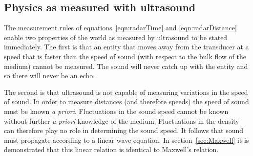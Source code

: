 \documentclass[10pt, fleqn,final,showtrims,oldfontcommands, article,a4paper,oneside]{memoir} %
\newcommand{\secref}[1]{section~\ref{sec:#1}}
\begin{document}




\subsection{Physics as measured with ultrasound}

The measurement rules of equations~\ref{eqn:radarTime} and \ref{eqn:radarDistance} enable two properties of the world as measured by ultrasound to be stated immediately.
The first is that an entity that moves away from the transducer at a speed that is faster than the speed of sound (with respect to the bulk flow of the medium) 
cannot be measured.  
The sound will never catch  up with the entity and so there will never be an echo.

The second is that ultrasound is not capable of  measuring variations in the speed of sound.
In order to measure distances (and therefore speeds) the speed of sound must be known {\em a priori}.
Fluctuations in the sound speed  cannot be known without further {\em a priori} knowledge of the medium. 
Fluctuations in the density  can therefore play no role in determining the sound speed. %
It follows that sound must propagate according to a linear wave equation. %
In \secref{Maxwell} it is demonstrated that this linear relation is identical to Maxwell's relation.
\end{document}
